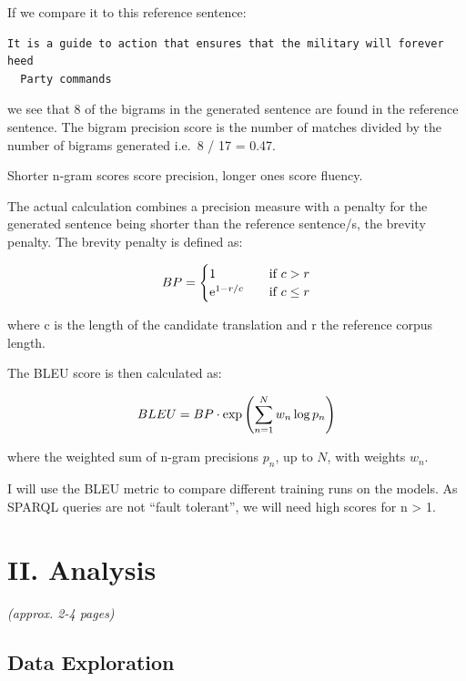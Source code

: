 \documentclass[12pt]{article}
\begin{document}
If we compare it to this reference sentence:

\begin{lstlisting}[]
  It is a guide to action that ensures that the military will forever heed
  Party commands
\end{lstlisting}

we see that 8 of the bigrams in the generated sentence are found in the
reference sentence. The bigram precision score is the number of matches
divided by the number of bigrams generated i.e.~8 / 17 = 0.47.

Shorter n-gram scores score precision, longer ones score fluency.

The actual calculation combines a precision measure with a penalty for 
the generated sentence being shorter than the reference sentence/s, the
brevity penalty. The brevity penalty is defined as:

\[ BP =
  \begin{cases}
    1               & \quad \text{if } c > r\\
    {\rm e}^{1-r/c} & \quad \text{if } c \leq r
  \end{cases}
\]

where c is the length of the candidate translation and r the reference
corpus length.

The BLEU score is then calculated as:

\[ BLEU = BP \cdot {\rm exp} \left( \sum_{n=1}^{N} w_n \log p_n \right) \]

where the weighted sum of n-gram precisions \(p_n\), up to \(N\), with weights \(w_n\).

I will use the BLEU metric to compare different training runs on the models.
As SPARQL queries are not ``fault tolerant'', we will need high scores for n
\textgreater{} 1.

\section{II. Analysis}\label{ii.-analysis}

\emph{(approx. 2-4 pages)}

\subsection{Data Exploration}\label{data-exploration}
\end{document}
